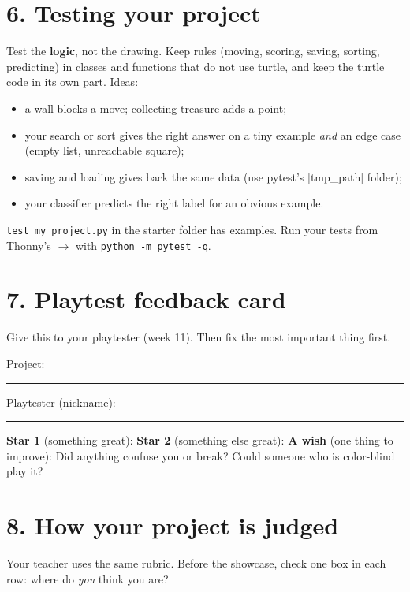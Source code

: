 \documentclass[level=3]{kidscode}
\begin{document}
\section{6. Testing your project}
Test the \textbf{logic}, not the drawing. Keep rules (moving, scoring, saving, sorting, predicting)
in classes and functions that do not use turtle, and keep the turtle code in its own part. Ideas:
\begin{itemize}[itemsep=1pt]
  \item a wall blocks a move; collecting treasure adds a point;
  \item your search or sort gives the right answer on a tiny example \emph{and} an edge case
        (empty list, unreachable square);
  \item saving and loading gives back the same data (use pytest's \py|tmp_path| folder);
  \item your classifier predicts the right label for an obvious example.
\end{itemize}
\texttt{test\_my\_project.py} in the starter folder has examples. Run your tests from Thonny's
 $\rightarrow$  with \texttt{python -m pytest -q}.

\section{7. Playtest feedback card}
Give this to your playtester (week 11). Then fix the most important thing first.

\begin{reflection}
Project: \rule{5cm}{0.4pt} \quad Playtester (nickname): \rule{4cm}{0.4pt}\par
\textbf{Star 1} (something great): 
\textbf{Star 2} (something else great): 
\textbf{A wish} (one thing to improve): 
Did anything confuse you or break? Could someone who is color-blind play it? 
\end{reflection}

\section{8. How your project is judged}
Your teacher uses the same rubric. Before the showcase, check one box in each row: where do \emph{you} think you are?
\end{document}
